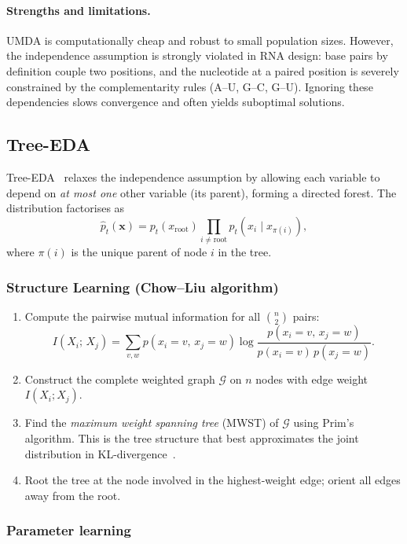 \documentclass[11pt,a4paper]{article}
\begin{document}
\paragraph{Strengths and limitations.} UMDA is computationally cheap and
robust to small population sizes. However, the independence assumption is
strongly violated in RNA design: base pairs by definition couple two
positions, and the nucleotide at a paired position is severely constrained
by the complementarity rules (A–U, G–C, G–U). Ignoring these dependencies
slows convergence and often yields suboptimal solutions.

\subsection{Tree-EDA}

Tree-EDA~\cite{baluja1997dependency, santana2008protein} relaxes the
independence assumption by allowing each variable to depend on \emph{at
most one} other variable (its parent), forming a directed forest. The
distribution factorises as
\[
  \hat{p}_t(\mathbf{x})
  = p_t(x_\mathrm{root}) \prod_{i \neq \mathrm{root}} p_t(x_i \mid x_{\pi(i)}),
\]
where $\pi(i)$ is the unique parent of node $i$ in the tree.

\subsubsection*{Structure Learning (Chow--Liu algorithm)}

\begin{enumerate}
  \item Compute the pairwise mutual information for all $\binom{n}{2}$ pairs:
    \[
      I(X_i;\, X_j) = \sum_{v,w} p(x_i{=}v,\, x_j{=}w)
        \log \frac{p(x_i{=}v,\, x_j{=}w)}{p(x_i{=}v)\,p(x_j{=}w)}.
    \]
  \item Construct the complete weighted graph $\mathcal{G}$ on $n$ nodes
    with edge weight $I(X_i; X_j)$.
  \item Find the \emph{maximum weight spanning tree} (MWST) of $\mathcal{G}$
    using Prim's algorithm. This is the tree structure that best approximates
    the joint distribution in KL-divergence~\cite{chow1968tree}.
  \item Root the tree at the node involved in the highest-weight edge; orient
    all edges away from the root.
\end{enumerate}

\subsubsection*{Parameter learning}
\end{document}
